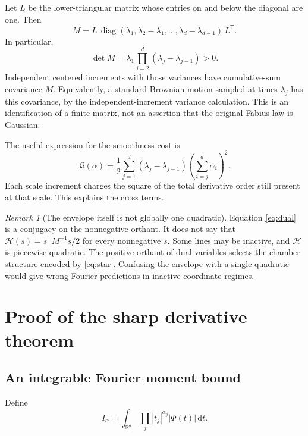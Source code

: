 \documentclass[11pt,a4paper]{article}
\numberwithin{equation}{section}
\theoremstyle{definition}
\theoremstyle{remark}\newtheorem{remark}[theorem]{Remark}
\newcommand{\R}{\mathbb R}\newcommand{\N}{\mathbb N}
\newcommand{\dd}{\,\mathrm d}
\newcommand{\He}{\mathcal H}
\newcommand{\Qf}{\mathcal Q}
\begin{document}
Let $L$ be the lower-triangular matrix whose entries on and below the diagonal
are one. Then
\begin{equation}
 M=L\,\operatorname{diag}(\lambda_1,\lambda_2-\lambda_1,
       \ldots,\lambda_d-\lambda_{d-1})\,L^{\mathsf T}.
 \label{eq:cholesky}
\end{equation}
In particular,
\begin{equation}
 \det M=\lambda_1\prod_{j=2}^d(\lambda_j-\lambda_{j-1})>0.
 \label{eq:detM}
\end{equation}
Independent centered increments with those variances have cumulative-sum
covariance $M$. Equivalently, a standard Brownian motion sampled at times
$\lambda_j$ has this covariance, by the independent-increment variance
calculation. This is an identification of a finite matrix, not an assertion
that the original Fabius law is Gaussian.

The useful expression for the smoothness cost is
\begin{equation}
 \Qf(\alpha)=\frac12\sum_{j=1}^d(\lambda_j-\lambda_{j-1})
                      \left(\sum_{i=j}^d\alpha_i\right)^2.
 \label{eq:costtail}
\end{equation}
Each scale increment charges the square of the total derivative order still
present at that scale. This explains the cross terms.

\begin{remark}[The envelope itself is not globally one quadratic]
Equation \eqref{eq:dual} is a conjugacy on the nonnegative orthant. It does not
say that $\He(s)=s^{\mathsf T}M^{-1}s/2$ for every nonnegative $s$.
Some lines may be inactive, and $\He$ is piecewise quadratic. The positive
orthant of dual variables selects the chamber structure encoded by
\eqref{eq:star}. Confusing the envelope with a single quadratic would give
wrong Fourier predictions in inactive-coordinate regimes.
\end{remark}

\section{Proof of the sharp derivative theorem}
\label{sec:derivatives}

\subsection{An integrable Fourier moment bound}

Define
\begin{equation}
 I_\alpha=\int_{\R^d}\prod_j|t_j|^{\alpha_j}|\Phi(t)|\dd t.
 \label{eq:Ialpha}
\end{equation}
\end{document}
